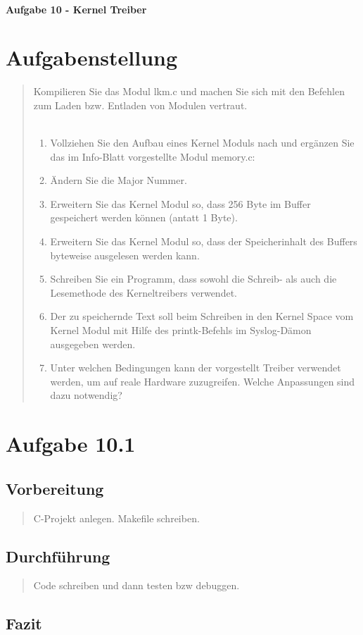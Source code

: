 \newpage

\paragraph{\LARGE Aufgabe 10 - Kernel Treiber}

\section{Aufgabenstellung}
	\begin{quote}
		Kompilieren Sie das Modul lkm.c und machen Sie sich mit den Befehlen zum Laden bzw. Entladen von Modulen vertraut.\\ \\
		\begin{enumerate}
			\item Vollziehen Sie den Aufbau eines Kernel Moduls nach und erg\"anzen Sie das im Info-Blatt vorgestellte Modul memory.c:\\
			\item \"Andern Sie die Major Nummer.\\
			\item Erweitern Sie das Kernel Modul so, dass 256 Byte im Buffer gespeichert werden k\"onnen (antatt 1 Byte).\\
			\item Erweitern Sie das Kernel Modul so, dass der Speicherinhalt des Buffers byteweise ausgelesen werden kann.\\
			\item Schreiben Sie ein Programm, dass sowohl die Schreib- als auch die Lesemethode des Kerneltreibers verwendet.\\
			\item Der zu speichernde Text soll beim Schreiben in den Kernel Space vom Kernel Modul mit Hilfe des printk-Befehls im Syslog-D\"amon ausgegeben werden.\\
			\item Unter welchen Bedingungen kann der vorgestellt Treiber verwendet werden, um auf reale Hardware zuzugreifen. Welche Anpassungen sind dazu notwendig?\\
		\end{enumerate}
	\end{quote}
\newpage
\section{Aufgabe 10.1}
	\subsection{Vorbereitung}
		\begin{quote}
			C-Projekt anlegen.
			Makefile schreiben.
		\end{quote}
	\subsection{Durchführung}
		\begin{quote}
			Code schreiben und dann testen bzw debuggen.
		\end{quote}
	\subsection{Fazit}
		\begin{quote}
			
		\end{quote}